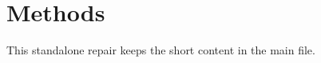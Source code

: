 \documentclass{article}
\begin{document}
\section{Methods}This standalone repair keeps the short content in the main file.
\end{document}
